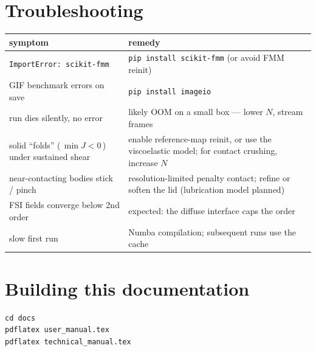 \documentclass[11pt]{article}
\begin{document}
\section{Troubleshooting}
\begin{center}
\small
\begin{tabular}{p{}p{}}
\toprule
symptom & remedy \\
\midrule
\texttt{ImportError: scikit-fmm} & \texttt{pip install scikit-fmm} (or avoid FMM reinit) \\
GIF benchmark errors on save & \texttt{pip install imageio} \\
run dies silently, no error & likely OOM on a small box --- lower $N$, stream frames \\
solid ``folds'' (\,$\min J<0$\,) under sustained shear & enable reference-map reinit,
or use the viscoelastic model; for contact crushing, increase $N$ \\
near-contacting bodies stick / pinch & resolution-limited penalty contact; refine or
soften the lid (lubrication model planned) \\
FSI fields converge below 2nd order & expected: the diffuse interface caps the order \\
slow first run & Numba compilation; subsequent runs use the cache \\
\bottomrule
\end{tabular}
\end{center}

\section{Building this documentation}
\begin{lstlisting}[style=sh]
cd docs
pdflatex user_manual.tex
pdflatex technical_manual.tex
\end{lstlisting}
\end{document}
